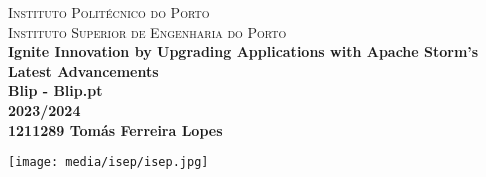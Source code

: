 \begin{titlepage}
    \center 

    \textsc{
        Instituto Politécnico do Porto\\[3mm]
        \LARGE Instituto Superior de Engenharia do Porto
    }
    \HRuleFront
    \\[4cm]

    {\huge \bfseries Ignite Innovation by Upgrading Applications with Apache Storm's Latest Advancements}\\[.5cm]

    {\bfseries Blip - Blip.pt }\\[1cm]
    {\Large \bfseries 2023/2024}\\[2cm]

    {\Large\bf 1211289 Tomás Ferreira Lopes}


    \vfill

    \texttt{[image: media/isep/isep.jpg]}\\

\end{titlepage}
